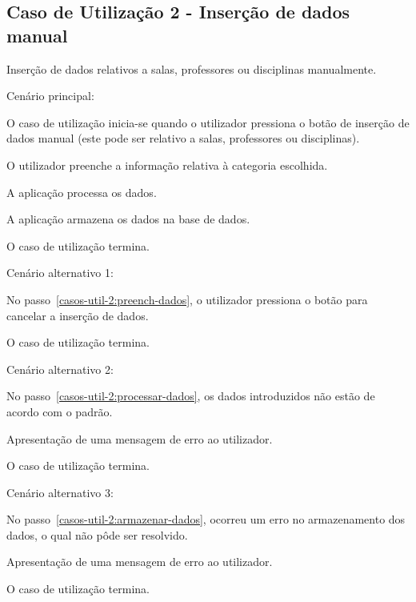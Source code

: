 \subsection*{Caso de Utilização 2 - Inserção de dados manual}
Inserção de dados relativos a salas, professores ou disciplinas manualmente.

Cenário principal:

\begin{compactenum}
    \item O caso de utilização inicia-se quando o utilizador pressiona o botão de inserção de dados manual (este pode ser relativo a salas, professores ou disciplinas).
    \item O utilizador preenche a informação relativa à categoria escolhida. \label{casos-util-2:preench-dados}
    \item A aplicação processa os dados. \label{casos-util-2:processar-dados}
    \item A aplicação armazena os dados na base de dados. \label{casos-util-2:armazenar-dados}
    \item O caso de utilização termina.
\end{compactenum}

Cenário alternativo 1:

\begin{compactenum}
    \item No passo~\ref{casos-util-2:preench-dados}, o utilizador pressiona o botão para cancelar a inserção de dados.
    \item O caso de utilização termina.
\end{compactenum}

Cenário alternativo 2:

\begin{compactenum}
    \item No passo~\ref{casos-util-2:processar-dados}, os dados introduzidos não estão de acordo com o padrão.
    \item Apresentação de uma mensagem de erro ao utilizador.
    \item O caso de utilização termina.
\end{compactenum}

Cenário alternativo 3:

\begin{compactenum}
    \item No passo~\ref{casos-util-2:armazenar-dados}, ocorreu um erro no armazenamento dos dados, o qual não pôde ser resolvido.
    \item Apresentação de uma mensagem de erro ao utilizador.
    \item O caso de utilização termina.
\end{compactenum}

